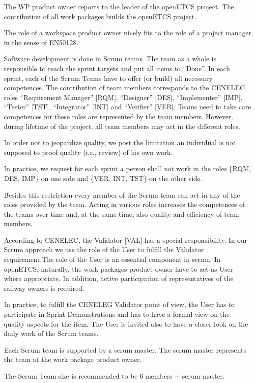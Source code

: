 \documentclass{template/openetcs_article}
\begin{document}
The WP product owner reports to the leader of the openETCS project. The contribution of all work packages builds the openETCS project.

The role of a workspace product owner nicely fits to the role of a project manager in the sense of EN50128.

Software development is done in Scrum teams. The team as a whole is responsible to reach the sprint targets and put all items to ``Done''. In each sprint, each of the Scrum Teams have to offer (or build) all necessary competences. The contribution of team members corresponds to the CENELEC roles ``Requirement Manager'' [RQM], ``Designer'' [DES], ``Implementer'' [IMP], ``Tester'' [TST], ``Integrator'' [INT] and ``Verifier'' [VER]. Teams need to take care competences for these roles are represented by the team members. However, during lifetime of the project, all team members may act in the different roles. 

In order not to jeopardize quality, we post the limitation an individual is not supposed to proof quality (i.e., review) of his own work. 

In practice, we request for each sprint a person shall not work in  the roles \{RQM, DES, IMP\} on one side and \{VER, INT, TST\} on the other side. 

Besides this restriction every member of the Scrum team can act in any of the roles provided by the team. Acting in various roles increases the competences of the teams over time and, at the same time, also quality and efficiency of team members.

According to CENELEC, the Validator [VAL] has a special responsibility. In our Scrum approach we use the role of the User to fulfill the Validator requirement.The role of the User is an essential component in scrum. In openETCS, naturally, the work packages product owner have to  act as User where appropriate.  In addition, active participation of representatives of the railway owners is required.

In practice, to fulfill the CENELEG Validator point of view, the User has to participate in Sprint Demonstrations and has to have a formal view on the quality aspects for the item. The User is invited also to have a closer look on the daily work of the Scrum teams.

Each Scrum team is supported by a scrum master. The scrum master represents the team at the work package product owner.

The Scrum Team size is recommended to be 6 members + scrum master.
\end{document}
